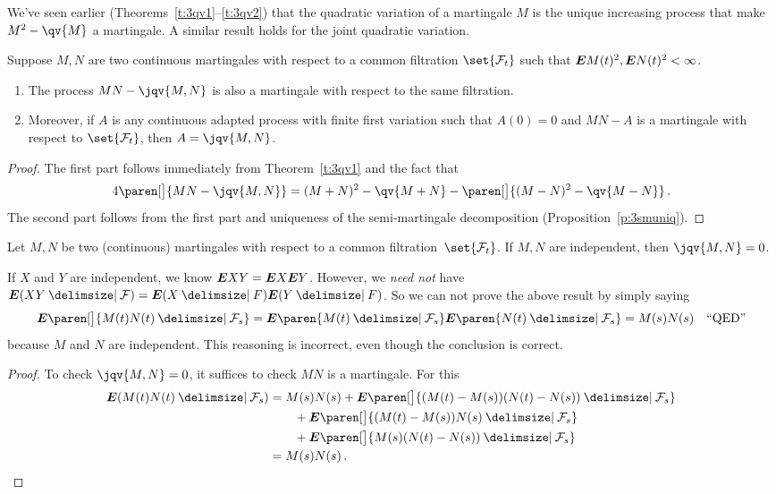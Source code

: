 We've seen earlier (Theorems~\ref{t:3qv1}--\ref{t:3qv2}) that the quadratic variation of a martingale $M$ is the unique increasing process that make $M^2 - \qv{M}$ a martingale.
A similar result holds for the joint quadratic variation.
\begin{proposition}
  Suppose $M, N$ are two continuous martingales with respect to a common filtration $\set{\mathcal F_t}$ such that $\bm{E} M(t)^2, \bm{E} N(t)^2 < \infty$.
  \begin{enumerate}
    \item
      The process $MN - \jqv{M,N}$ is also a martingale with respect to the same filtration.
    \item
      Moreover, if $A$ is any continuous adapted process with finite first variation such that $A(0) = 0$ and $MN - A$ is a martingale with respect to $\set{\mathcal F_t}$, then $A = \jqv{M,N}$.
  \end{enumerate}
\end{proposition}
\begin{proof}
  The first part follows immediately from Theorem~\ref{t:3qv1} and the fact that
  \begin{equation*}
    4 \paren[\big]{ MN - \jqv{M,N} }
      = (M+N)^2 - \qv{M+N} - \paren[\big]{(M-N)^2 - \qv{M-N}}\,.
  \end{equation*}
  The second part follows from the first part and uniqueness of the semi-martingale decomposition (Proposition~\ref{p:3smuniq}).
\end{proof}
\begin{corollary}
  Let $M, N$ be two (continuous) martingales with respect to a common filtration~$\set{\mathcal F_t}$.
  If $M,N$ are independent, then $\jqv{M,N} = 0$.
\end{corollary}
\begin{remark}
  If $X$ and $Y$ are independent, we know $\bm{E} XY = \bm{E} X \bm{E} Y$.
  However, we \emph{need not} have $\E (XY \given \mathcal F) = \E(X \given F) \E (Y \given F)$.
  So we can not prove the above result by simply saying
  \begin{equation*}
    \E \paren[\big]{ M(t) N(t) \given \mathcal F_s }
      = \E \paren{ M(t) \given \mathcal F_s }
	  \E \paren{ N(t) \given \mathcal F_s }
      = M(s) N(s)
      \quad\text{``QED''}
  \end{equation*}
  because $M$ and $N$ are independent.
  This reasoning is incorrect, even though the conclusion is correct.
\end{remark}
\begin{proof}
  To check $\jqv{M,N} = 0$, it suffices to check $M N$ is a martingale.
  For this
  \begin{align*}
    \E( M(t) N(t) \given \mathcal F_s )
      &= M(s) N(s)
	+ \E \paren[\big]{ (M(t) - M(s)) (N(t) - N(s)) \given \mathcal F_s }
    \\
	&\qquad+ \E \paren[\big]{ (M(t) - M(s)) N(s)  \given \mathcal F_s }
    \\
	&\qquad+ \E \paren[\big]{ M(s) (N(t) - N(s)) \given \mathcal F_s }
    \\
      &= M(s) N(s)\,.
      \qedhere
  \end{align*}
\end{proof}
